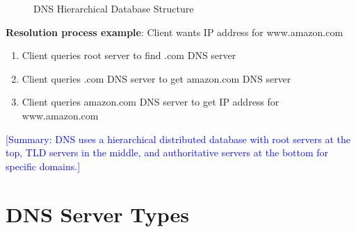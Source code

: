 \documentclass[12pt]{article}
\begin{document}

\begin{figure}[htbp]
    \centering
    \caption{DNS Hierarchical Database Structure}
    \label{fig:dns_hierarchy}
\end{figure}


\textbf{Resolution process example}: Client wants IP address for www.amazon.com
\begin{enumerate}
    \item Client queries root server to find .com DNS server
    \item Client queries .com DNS server to get amazon.com DNS server
    \item Client queries amazon.com DNS server to get IP address for www.amazon.com
\end{enumerate}

\textcolor{blue}{[Summary: DNS uses a hierarchical distributed database with root servers at the top, TLD servers in the middle, and authoritative servers at the bottom for specific domains.]}

\section{DNS Server Types}
\end{document}
